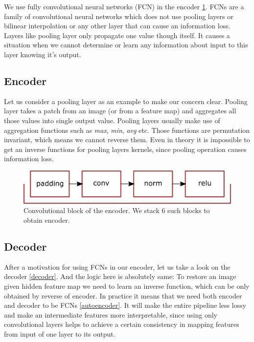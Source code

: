 We use fully convolutional neural networks (FCN) in the encoder \ref{encoder}. FCNs are a family of convolutional neural networks which does not use pooling layers or bilinear interpolation or any other layer that can cause an information loss. Layers like pooling layer only propagate one value though itself. It causes a situation when we cannot determine or learn any information about input to this layer knowing it's output.

\subsection{Encoder}

Let us consider a pooling layer as an example to make our concern clear. Pooling layer takes a patch from an image (or from a feature map) and aggregates all those values into single output value. Pooling layers usually make use of aggregation functions such as \textit{max}, \textit{min}, \textit{avg} etc. Those functions are permutation invariant, which means we cannot reverse them. Even in theory it is impossible to get an inverse functions for pooling layers kernels, since pooling operation causes information loss.

\begin{figure}[!ht]
    \centering
    \includegraphics[width=\textwidth]{figure/encoder.png}
    \caption{Convolutional block of the encoder. We stack 6 such blocks to obtain encoder.}
    \label{encoder}
\end{figure}

\subsection{Decoder}

After a motivation for using FCNs in our encoder, let us take a look on the decoder \ref{decoder}. And the logic here is absolutely same: To restore an image given hidden feature map we need to learn an inverse function, which can be only obtained by reverse of encoder. In practice it means that we need both encoder and decoder to be FCNs \ref{autoencoder}. It will make the entire pipeline less lossy and make an intermediate features more interpretable, since using only convolutional layers helps to achieve a certain consistency in mapping features from input of one layer to its output.

